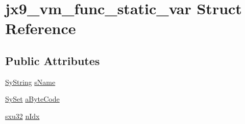 \hypertarget{structjx9__vm__func__static__var}{\section{jx9\-\_\-vm\-\_\-func\-\_\-static\-\_\-var Struct Reference}
\label{d5/d98/structjx9__vm__func__static__var}
}
\subsection*{Public Attributes}
\begin{DoxyCompactItemize}
\item 
\hyperlink{struct_sy_string}{Sy\-String} \hyperlink{structjx9__vm__func__static__var_ad69869623f21073acc50a331eaa6de0c}{s\-Name}
\item 
\hyperlink{struct_sy_set}{Sy\-Set} \hyperlink{structjx9__vm__func__static__var_a2fb6d9d63e7eed7f0ae01cdf492c0ef0}{a\-Byte\-Code}
\item 
\hyperlink{unqlite_8c_abc5a8a3f345c200c98c485551f49666e}{sxu32} \hyperlink{structjx9__vm__func__static__var_a334cff471909616b3e6b075f86ad1186}{n\-Idx}
\end{DoxyCompactItemize}


